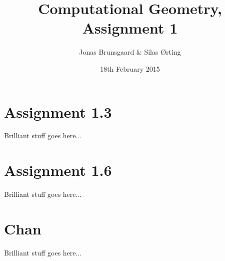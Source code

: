 \documentclass[10pt,a4paper,final,oneside,openany,article]{memoir}
\title{Computational Geometry, Assignment 1}
\author{
    Jonas Brunsgaard \& Silas Ørting
}
\date{18th February 2015}
\begin{document}
\maketitle

\chapter*{Assignment 1.3}
Brilliant stuff goes here...

\chapter*{Assignment 1.6}
Brilliant stuff goes here...

\chapter*{Chan}
Brilliant stuff goes here...
\end{document}
